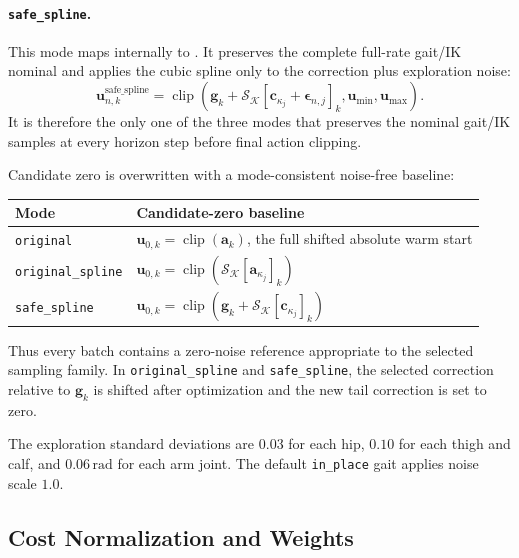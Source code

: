 \documentclass[11pt,a4paper]{article}
\newcommand{\clip}{\operatorname{clip}}
\newcommand{\code}[1]{\texttt{#1}}
\begin{document}
\paragraph{\code{safe\_spline}.}
This mode maps internally to . It
preserves the complete full-rate gait/IK nominal and applies the cubic spline
only to the correction plus exploration noise:
\begin{equation}
  \boxed{
  \bm{u}_{n,k}^{\mathrm{safe\_spline}}
  =\clip\left(
    \bm{g}_k+
    \mathcal{S}_{\mathcal{K}}
    [\bm{c}_{\kappa_j}+\bm{\epsilon}_{n,j}]_k,
    \bm{u}_{\min},\bm{u}_{\max}
  \right).
  }
\end{equation}
It is therefore the only one of the three modes that preserves the nominal
gait/IK samples at every horizon step before final action clipping.

Candidate zero is overwritten with a mode-consistent noise-free baseline:
\begin{center}
\begin{tabular}{p{}p{}}
\toprule
Mode & Candidate-zero baseline\\
\midrule
\code{original}
& $\bm{u}_{0,k}=\clip(\bm{a}_k)$, the full shifted absolute warm start\\
\code{original\_spline}
& $\bm{u}_{0,k}=\clip(
   \mathcal{S}_{\mathcal{K}}[\bm{a}_{\kappa_j}]_k)$\\
\code{safe\_spline}
& $\bm{u}_{0,k}=\clip(
   \bm{g}_k+\mathcal{S}_{\mathcal{K}}[\bm{c}_{\kappa_j}]_k)$\\
\bottomrule
\end{tabular}
\end{center}
Thus every batch contains a zero-noise reference appropriate to the selected
sampling family. In \code{original\_spline} and \code{safe\_spline}, the
selected correction relative to $\bm{g}_k$ is shifted after optimization and
the new tail correction is set to zero.

The exploration standard deviations are $0.03$ for each hip, $0.10$ for each
thigh and calf, and $0.06\,\mathrm{rad}$ for each arm joint. The default
\code{in\_place} gait applies noise scale $1.0$.

\subsection{Cost Normalization and Weights}
\end{document}
